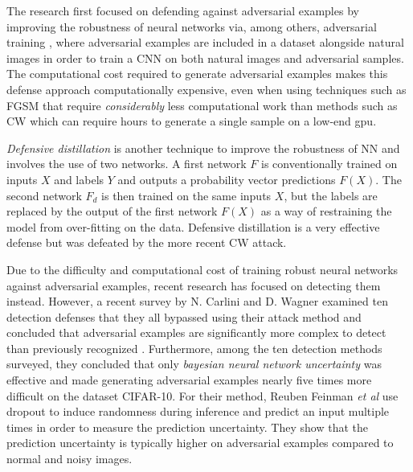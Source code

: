 The research first focused on defending against adversarial examples by
improving the robustness of neural networks via, among others, adversarial
training \cite{goodfellow_explaining_2015,papernot_limitations_2015}, where
adversarial examples are included in a dataset alongside natural images in order
to train a CNN on both natural images and adversarial samples. The computational
cost required to generate adversarial examples makes this defense approach
computationally expensive, even when using techniques such as FGSM that require
\emph{considerably} less computational work than methods such as CW which can
require hours to generate a single sample on a low-end gpu.

\textit{Defensive distillation} \cite{papernot_distillation_2016} is another
technique to improve the robustness of NN and involves the use of two networks.
A first network $F$ is conventionally trained on inputs $X$ and labels $Y$ and
outputs a probability vector predictions $F(X)$. The second network $F_{d}$ is
then trained on the same inputs $X$, but the labels are replaced by the output
of the first network $F(X)$ as a way of restraining the model from over-fitting
on the data. Defensive distillation is a very effective defense but was defeated
by the more recent CW attack.

Due to the difficulty and computational cost of training robust neural networks
against adversarial examples, recent research has focused on detecting them
instead. However, a recent survey by N. Carlini and D. Wagner examined ten
detection defenses that they all bypassed using their attack method and
concluded that adversarial examples are significantly more complex to detect
than previously recognized \cite{carlini_adversarial_2017}. Furthermore, among
the ten detection methods surveyed, they concluded that only \textit{bayesian
    neural network uncertainty} \cite{feinman_detecting_2017} was effective and made
generating adversarial examples nearly five times more difficult on the dataset
CIFAR-10. For their method, Reuben Feinman \emph{et al} use dropout
\cite{srivastava_dropout_2014} to induce randomness during inference and predict
an input multiple times in order to measure the prediction uncertainty. They
show that the prediction uncertainty is typically higher on adversarial examples
compared to normal and noisy images.

